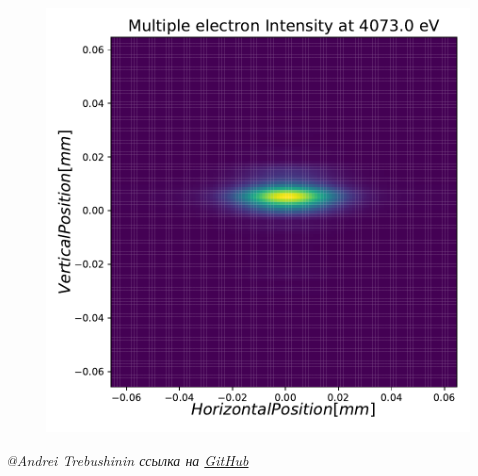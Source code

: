 \documentclass[14pt, hyperref = {colorlinks}]{beamer}
\begin{document}
\begin{frame}
\begin{figure}[h]
\begin{minipage}[h]{0.32\linewidth}
	\end{minipage}
	\begin{minipage}[h]{0.32\linewidth}
		\raggedright{\includegraphics[width=0.79\linewidth]{pic/3_harm_after_Sph_Mir_2d.pdf}}
	\end{minipage}
\end{figure}

\vspace{25pt}	
\tiny{\textit{@Andrei Trebushinin ссылка на \href{https://github.com/TrebAndrew/thesis_andrei.git}{GitHub}}}
\end{frame}
\end{document}
